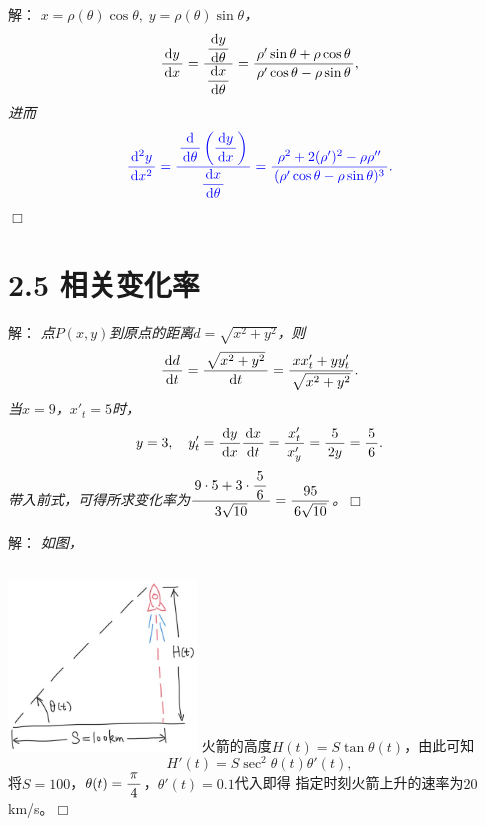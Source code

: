 \begin{frame}
	\linespread{1.5}
	\pause
	
	\bigskip
	
	\small 解：\it
	$x=\rho(\theta)\cos\theta,\;y=\rho(\theta)\sin\theta$，
	$$\df{\d y}{\d x}=\df{\df{\d y}{\d\theta}}{\df{\d x}{\d\theta}}
	=\df{\rho'\sin\theta+\rho\cos\theta}{\rho'\cos\theta-\rho\sin\theta},$$
	\pause
	进而
	$$\b
	\df{\d^2y}{\d x^2}
	=\df{\df{\d}{\d\theta}\left(\df{\d y}{\d x}\right)}{\df{\d x}{\d\theta}}
	=\df{\rho^2+2(\rho')^2-\rho\rho''}{(\rho'\cos\theta-\rho\sin\theta)^3}.
	$$
	\hfill$\Box$
\end{frame}

\section{2.5 相关变化率}

\begin{frame}
	\linespread{1.5}
	\pause
	
	
	\small 解：\it
	点$P(x,y)$到原点的距离$d=\sqrt{x^2+y^2}$，则
	$$\df{\d d}{\d t}=\df{\sqrt{x^2+y^2}}{\d t}
	=\df{xx'_t+yy'_t}{\sqrt{x^2+y^2}}.$$
	\pause 当$x=9$，$x'_t=5$时，
	$$
		y=3,\quad
		y'_t=\df{\d y}{\d x}{\df{\d x}{\d t}}
		=\df{x'_t}{x'_y}=\df5{2y}=\df56.
	$$
	带入前式，可得所求变化率为$\df{9\cdot 5+3\cdot\df56}{3\sqrt{10}}
	=\df{95}{6\sqrt{10}}$。\hfill$\Box$
\end{frame}

\begin{frame}
	\linespread{1.5}
	\pause
	
	
	\small 解：\it
	如图，
	\begin{columns}
		\includegraphics[width=5cm]{./images/ch2/Rocket.jpg}
		\pause 火箭的高度$H(t)=S\tan\theta(t)$，由此可知
		$$H'(t)=S\sec^2\theta(t)\theta'(t),$$
		\pause 将$S=100$，$\theta(t)=\df{\pi}4$，$\theta'(t)=0.1$代入即得
		指定时刻火箭上升的速率为$20$km/s。\hfill$\Box$
	\end{columns}
\end{frame}

